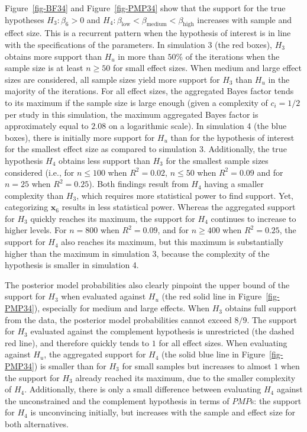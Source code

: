 \documentclass[
]{interact}
\begin{document}
Figure~\ref{fig-BF34} and Figure~\ref{fig-PMP34} show that the support
for the true hypotheses \(H_3:\beta_6>0\) and
\(H_4: \beta_{\text{low}} < \beta_{\text{medium}} < \beta_{\text{high}}\)
increases with sample and effect size. This is a recurrent pattern when
the hypothesis of interest is in line with the specifications of the
parameters. In simulation 3 (the red boxes), \(H_3\) obtains more
support than \(H_u\) in more than \(50\%\) of the iterations when the
sample size is at least \(n \geq 50\) for small effect sizes. When
medium and large effect sizes are considered, all sample sizes yield
more support for \(H_3\) than \(H_u\) in the majority of the iterations.
For all effect sizes, the aggregated Bayes factor tends to its maximum
if the sample size is large enough (given a complexity of \(c_i = 1/2\)
per study in this simulation, the maximum aggregated Bayes factor is
approximately equal to \(2.08\) on a logarithmic scale). In simulation 4
(the blue boxes), there is initially more support for \(H_u\) than for
the hypothesis of interest for the smallest effect size as compared to
simulation 3. Additionally, the true hypothesis \(H_4\) obtains less
support than \(H_3\) for the smallest sample sizes considered (i.e., for
\(n \leq 100\) when \(R^2 = 0.02\), \(n \leq 50\) when \(R^2 = 0.09\)
and for \(n = 25\) when \(R^2 = 0.25\)). Both findings result from
\(H_4\) having a smaller complexity than \(H_3\), which requires more
statistical power to find support. Yet, categorizing
\(\boldsymbol{x}_6\) results in less statistical power. Whereas the
aggregated support for \(H_3\) quickly reaches its maximum, the support
for \(H_4\) continues to increase to higher levels. For \(n = 800\) when
\(R^2 = 0.09\), and for \(n \geq 400\) when \(R^2 = 0.25\), the support
for \(H_4\) also reaches its maximum, but this maximum is substantially
higher than the maximum in simulation 3, because the complexity of the
hypothesis is smaller in simulation 4.

The posterior model probabilities also clearly pinpoint the upper bound
of the support for \(H_3\) when evaluated against \(H_u\) (the red solid
line in Figure~\ref{fig-PMP34}), especially for medium and large
effects. When \(H_3\) obtains full support from the data, the posterior
model probabilities cannot exceed \(8/9\). The support for \(H_3\)
evaluated against the complement hypothesis is unrestricted (the dashed
red line), and therefore quickly tends to \(1\) for all effect sizes.
When evaluating against \(H_u\), the aggregated support for \(H_4\) (the
solid blue line in Figure~\ref{fig-PMP34}) is smaller than for \(H_3\)
for small samples but increases to almost \(1\) when the support for
\(H_3\) already reached its maximum, due to the smaller complexity of
\(H_4\). Additionally, there is only a small difference between
evaluating \(H_4\) against the unconstrained and the complement
hypothesis in terms of \(PMP\)s: the support for \(H_4\) is unconvincing
initially, but increases with the sample and effect size for both
alternatives.
\end{document}
